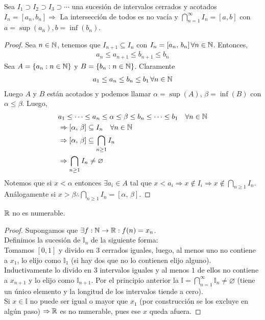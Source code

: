 \begin{theorem}
	Sea \(I_1 \supset I_2 \supset I_3 \supset \cdots \) una sucesión de intervalos cerrados y acotados \(I_n = [a_n, b_n] \Rightarrow \)
	La intersección de todos es no vacía y \(\bigcap_{n=1}^{\infty} I_n = [a,b]\) con \(a = \sup(a_n), b=\inf(b_n)\).
	\begin{proof}
		Sea \(n \in \mathbb{N} \), tenemos que \(I_{n+1} \subseteq I_n\) con \(I_n = [a_n\text{, } b_n] \, \forall n \in \mathbb{N} \). Entonces, \begin{align*}
			a_n \leq a_{n+1} \leq b_{n+1} \leq b_n
		\end{align*}
		Sea \(A = \{ a_n : n \in \mathbb{N} \} \) y \(B = \{ b_n : n \in \mathbb{N} \} \). Claramente \begin{align*}
			a_1 \leq a_n \leq b_n \leq b_1 \, \forall n \in \mathbb{N}
		\end{align*}
		Luego \(A\) y \(B\) están acotados y podemos llamar \(\alpha = \sup(A)\), \(\beta = \inf(B)\) con \(\alpha \leq \beta \). Luego, \begin{align*}
			 & a_1 \leq \cdots \leq a_n \leq \alpha \leq \beta \leq b_n \leq \cdots \leq b_1 \quad \forall n \in \mathbb{N} \\
			 & \Rightarrow [\alpha\text{, }\beta] \subseteq I_n \quad \forall n \in \mathbb{N}                              \\
			 & \Rightarrow [\alpha\text{, }\beta] \subseteq \bigcap_{n \geq 1} I_n                                  \\
			 & \Rightarrow \bigcap_{n \geq 1} I_n \neq \varnothing
		\end{align*}
		Notemos que si \(x < \alpha \) entonces \(\exists a_i \in A\) tal que \(x < a_i \Rightarrow x \notin I_i \Rightarrow x \notin \bigcap_{n \geq 1} I_n\).
		Análogamente si \(x > \beta \therefore \bigcap_{n \geq 1} I_n = [\alpha\text{, }\beta]\).
	\end{proof}
\end{theorem}

\begin{theorem}
	\(\mathbb{R} \)  no es numerable.
	\begin{proof}
		Supongamos que \(\exists f:\mathbb{N} \to \mathbb{R} : f(n) = x_n\). \\
		Definimos la sucesión de \(\mathbb{I}_n\) de la siguiente forma: \\
		Tomamos \([0, 1]\) y divido en \(3\) cerrados iguales, luego, al menos uno no contiene a \(x_1\), lo elijo como \(\mathbb{I}_1\) (si  hay dos que no lo contienen elijo alguno). Inductivamente lo divido en \(3\) intervalos iguales y al menos \(1\) de ellos no contiene a \(x_{n+1} \) y lo elijo como \(\mathbb{I}_{n+1} \). Por el principio anterior la \(\mathbb{I} = \bigcap_{n=1}^\infty \mathbb{I}_n \neq \varnothing \) (tiene un único elemento y la longitud de los intervalos tiende a cero). \\
		Si \(x \in \mathbb{I} \) no puede ser igual o mayor que \(x_1\) (por construcción se los excluye en algún paso) \(\Rightarrow \mathbb{R} \) es no numerable, pues ese \(x\) queda afuera.
	\end{proof}
\end{theorem}

